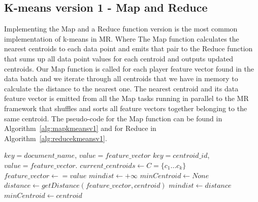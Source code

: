 \subsection{K-means version 1 - Map and Reduce}
Implementing the Map and a Reduce function version is the most common implementation of k-means in MR. Where The Map function calculates the nearest centroids to each data point and emits that pair to the Reduce function that sums up all data point values for each centroid and outputs updated centroids. Our Map function is called for each player feature vector found in the data batch and we iterate through all centroids that we have in memory to calculate the distance to the nearest one. The nearest centroid and its data feature vector is emitted from all the Map tasks running in parallel to the MR framework that shuffles and sorts all feature vectors together belonging to the same centroid. The pseudo-code for the Map function can be found in Algorithm~\ref{alg:mapkmeansv1} and for Reduce in Algorithm~\ref{alg:reducekmeansv1}.

\begin{center}
\newcommand{\map}{\ensuremath{\mbox{\sc Kmeans version 1: Map}}}
\begin{algorithm}[h!]
\caption{$\map(key,value)$}\label{alg:mapkmeansv1}
\begin{algorithmic}[1]
\REQUIRE $key = document\_name$, $value = feature\_vector$
\ENSURE $key = centroid\_id$, $value = feature\_vector$.
\STATE $current\_centroids \leftarrow C = \{c_1...c_k\}$ 
\STATE $feature\_vector \leftarrow = value$
\medskip
\STATE  $mindist \leftarrow +\infty$
\STATE $minCentroid \leftarrow None$
	\STATE $distance \leftarrow getDistance(feature\_vector, centroid) $
		\STATE $mindist \leftarrow distance$
		\STATE $minCentroid \leftarrow centroid$ 
	\ENDIF
\ENDFOR
\medskip
{}
\end{algorithmic}
\end{algorithm}
\end{center}

